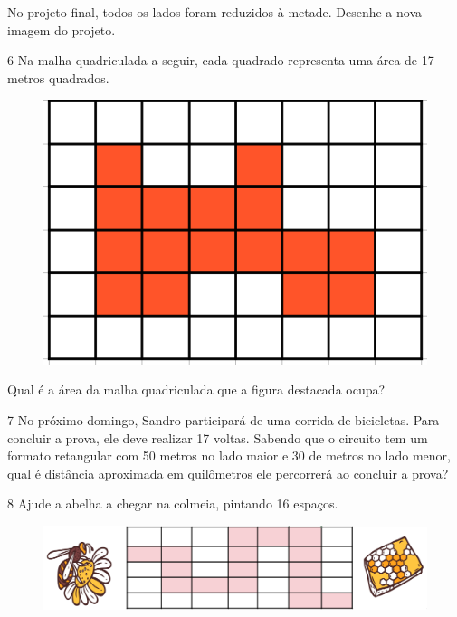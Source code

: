 No projeto final, todos os lados foram reduzidos à metade. Desenhe a nova imagem do projeto.

\begin{mdframed}[linewidth=2pt,linecolor=salmao,roundcorner=2pt]
\vspace{7cm}
\end{mdframed}
\pagebreak

\num{6} Na malha quadriculada a seguir, cada quadrado representa uma área de 17
metros quadrados.

\begin{figure}[htpb!]
\centering
\includegraphics[width=.7\textwidth]{media/image33_.png}
\end{figure}

Qual é a área da malha quadriculada que a figura destacada ocupa?


\num{7} No próximo domingo, Sandro participará de uma corrida de bicicletas.
Para concluir a prova, ele deve realizar 17 voltas. Sabendo que o circuito tem um formato
retangular com 50 metros no lado maior e 30 de metros no lado menor, qual é distância aproximada em quilômetros ele percorrerá ao concluir a prova?


\num{8} Ajude a abelha a chegar na colmeia, pintando 16 espaços.

\begin{figure}[htpb!]
\centering
\includegraphics[width=\textwidth]{media/image33a.png}
\end{figure}  



